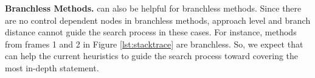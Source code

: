 \textbf{Branchless Methods. } 
%
\bbc can also be helpful for branchless methods. Since there are no control dependent nodes in branchless methods, approach level and branch distance cannot guide the search process in these cases. For instance, methods from frames 1 and 2 in Figure \ref{lst:stacktrace} are branchless. So, we expect that \bbc can help the current heuristics to guide the search process toward covering the most in-depth statement.